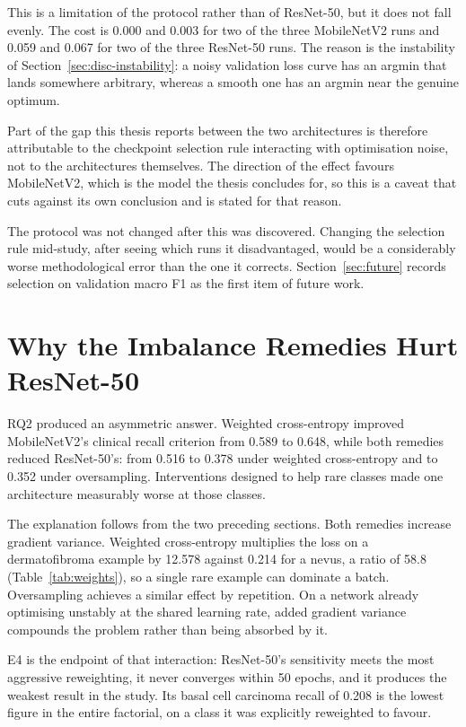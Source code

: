 This is a limitation of the protocol rather than of ResNet-50, but it does not fall
evenly. The cost is 0.000 and 0.003 for two of the three MobileNetV2 runs and 0.059 and
0.067 for two of the three ResNet-50 runs. The reason is the instability of
Section~\ref{sec:disc-instability}: a noisy validation loss curve has an argmin that
lands somewhere arbitrary, whereas a smooth one has an argmin near the genuine optimum.

Part of the gap this thesis reports between the two architectures is therefore
attributable to the checkpoint selection rule interacting with optimisation noise, not to
the architectures themselves. The direction of the effect favours MobileNetV2, which is
the model the thesis concludes for, so this is a caveat that cuts against its own
conclusion and is stated for that reason.

The protocol was not changed after this was discovered. Changing the selection rule
mid-study, after seeing which runs it disadvantaged, would be a considerably worse
methodological error than the one it corrects. Section~\ref{sec:future} records
selection on validation macro F1 as the first item of future work.

\section{Why the Imbalance Remedies Hurt ResNet-50}
\label{sec:disc-remedies}

RQ2 produced an asymmetric answer. Weighted cross-entropy improved MobileNetV2's clinical
recall criterion from 0.589 to 0.648, while both remedies reduced ResNet-50's: from 0.516
to 0.378 under weighted cross-entropy and to 0.352 under oversampling. Interventions
designed to help rare classes made one architecture measurably worse at those classes.

The explanation follows from the two preceding sections. Both remedies increase gradient
variance. Weighted cross-entropy multiplies the loss on a dermatofibroma example by 12.578
against 0.214 for a nevus, a ratio of 58.8 (Table~\ref{tab:weights}), so a single rare
example can dominate a batch. Oversampling achieves a similar effect by repetition. On a
network already optimising unstably at the shared learning rate, added gradient variance
compounds the problem rather than being absorbed by it.

E4 is the endpoint of that interaction: ResNet-50's sensitivity meets the most aggressive
reweighting, it never converges within 50 epochs, and it produces the weakest result in
the study. Its basal cell carcinoma recall of 0.208 is the lowest figure in the entire
factorial, on a class it was explicitly reweighted to favour.

